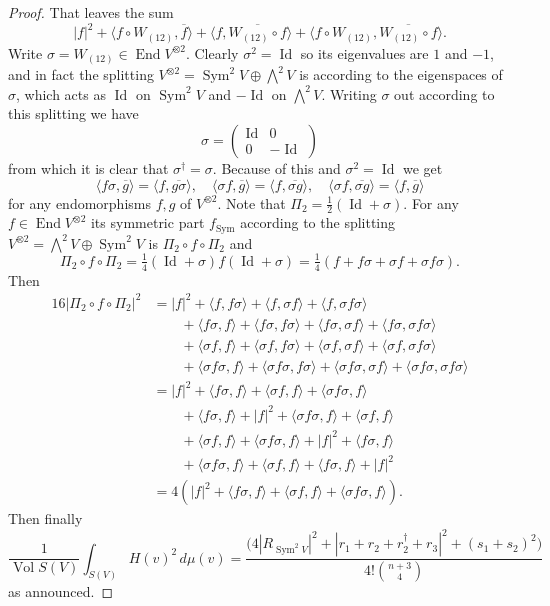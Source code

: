 \documentclass[10pt,a4paper]{amsart}
\theoremstyle{definition}
\def\<{\langle}
\def\>{\rangle}
\def\ov#1{\overline{#1}}
\DeclareMathOperator{\Sym}{Sym}
\DeclareMathOperator{\id}{Id}
\DeclareMathOperator{\Vol}{Vol}
\DeclareMathOperator{\End}{End}
\begin{document}
\begin{proof}
That leaves the sum
$$
|f|^2
+ \< f \circ W_{(12)}, \ov f \>
+ \< f, \ov{W_{(12)} \circ f} \>
+ \< f \circ W_{(12)}, \ov{W_{(12)} \circ f} \>.
$$
Write $\sigma = W_{(12)} \in \End V^{\otimes 2}$.
Clearly $\sigma^2 = \id$ so its eigenvalues are $1$ and $-1$, and in fact
the splitting $V^{\otimes 2} = \Sym^2 V \oplus \bigwedge^2 V$
is according to the eigenspaces of $\sigma$,
which acts as $\id$ on $\Sym^2V$ and $-\id$ on $\bigwedge^2 V$.
Writing $\sigma$ out according to this splitting we have
$$
\sigma = \begin{pmatrix}
\id & 0
\\
0 & -\id
\end{pmatrix}
$$
from which it is clear that $\sigma^\dagger = \sigma$.
Because of this and $\sigma^2 = \id$ we get
$$
\< f \sigma, \ov g \> = \<f, \ov{g\sigma}\>,
\quad
\< \sigma f , \ov g \> = \<f, \ov{\sigma g}\>,
\quad
\< \sigma f, \ov{\sigma g} \> = \<f, \ov g\>
$$
for any endomorphisms $f,g$ of $V^{\otimes 2}$.
Note that $\Pi_2 = \frac12(\id + \sigma)$.
For any $f \in \End V^{\otimes 2}$ its symmetric part $f_{\Sym}$ according to
the splitting $V^{\otimes 2} = \bigwedge^2 V \oplus \Sym^2 V$ is $\Pi_2 \circ f
\circ \Pi_2$ and
$$
\Pi_2 \circ f \circ \Pi_2
= \tfrac14 (\id + \sigma) f (\id + \sigma)
= \tfrac14 (f + f \sigma + \sigma f + \sigma f \sigma).
$$
Then
\begin{align*}
16 |\Pi_2 \circ f \circ \Pi_2|^2
&= |f|^2
+ \< f, f \sigma \>
+ \< f, \sigma f \>
+ \< f, \sigma f \sigma \>
\\
&\qquad
+ \< f \sigma, f \>
+ \< f \sigma, f \sigma \>
+ \< f \sigma, \sigma f \>
+ \< f \sigma, \sigma f \sigma \>
\\
&\qquad
+ \< \sigma f, f \>
+ \< \sigma f, f \sigma \>
+ \< \sigma f, \sigma f \>
+ \< \sigma f, \sigma f \sigma \>
\\
&\qquad
+ \< \sigma f \sigma, f \>
+ \< \sigma f \sigma, f \sigma \>
+ \< \sigma f \sigma, \sigma f \>
+ \< \sigma f \sigma, \sigma f \sigma \>
\\
&= |f|^2
+ \< f \sigma, f \>
+ \< \sigma f, f \>
+ \< \sigma f \sigma, f \>
\\
&\qquad
+ \< f \sigma, f \>
+ |f|^2
+ \< \sigma f \sigma, f \>
+ \< \sigma f , f \>
\\
&\qquad
+ \< \sigma f, f \>
+ \< \sigma f \sigma, f \>
+ |f|^2
+ \< f\sigma , f \>
\\
&\qquad
+ \< \sigma f \sigma, f \>
+ \< \sigma f, f \>
+ \< f \sigma, f \>
+ |f|^2
\\
&= 4(|f|^2
+ \< f \sigma, f \>
+ \< \sigma f, f \>
+ \< \sigma f \sigma, f \>).
\end{align*}
Then finally
$$
\frac{1}{\Vol S(V)}
\int_{S(V)}
\!\!\!
H(v)^2 \, d\mu(v)
= \frac{
\bigl(
4 |R_{\Sym^2 V}|^2
+ |r_1 + r_2 + r_2^\dagger + r_3|^2
+ (s_1 + s_2)^2
\bigr)
}{4! \binom{n+3}{4}}
$$
as announced.
\end{proof}
\end{document}
